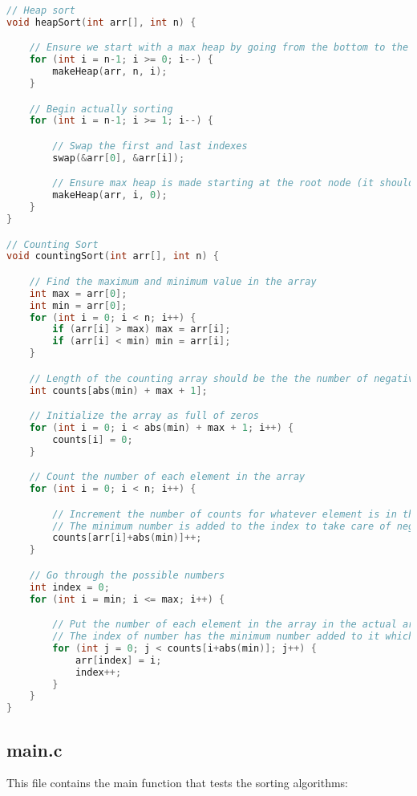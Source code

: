 \documentclass[12pt]{article}
\begin{document}
\begin{lstlisting}[language=c]
// Heap sort
void heapSort(int arr[], int n) {

	// Ensure we start with a max heap by going from the bottom to the top
	for (int i = n-1; i >= 0; i--) {
		makeHeap(arr, n, i);
	}

	// Begin actually sorting
	for (int i = n-1; i >= 1; i--) {

		// Swap the first and last indexes
		swap(&arr[0], &arr[i]);

		// Ensure max heap is made starting at the root node (it should be the largest)
		makeHeap(arr, i, 0);
	}
}

// Counting Sort
void countingSort(int arr[], int n) {

	// Find the maximum and minimum value in the array
	int max = arr[0];
	int min = arr[0];
	for (int i = 0; i < n; i++) {
		if (arr[i] > max) max = arr[i];
		if (arr[i] < min) min = arr[i];
	}

	// Length of the counting array should be the the number of negatives plus the number of positives plus another spot for 0
	int counts[abs(min) + max + 1];

	// Initialize the array as full of zeros
	for (int i = 0; i < abs(min) + max + 1; i++) {
		counts[i] = 0;
	}

	// Count the number of each element in the array
	for (int i = 0; i < n; i++) {

		// Increment the number of counts for whatever element is in the array
		// The minimum number is added to the index to take care of negative values
		counts[arr[i]+abs(min)]++;
	}

	// Go through the possible numbers
	int index = 0;
	for (int i = min; i <= max; i++) {

		// Put the number of each element in the array in the actual array
		// The index of number has the minimum number added to it which is to take care of negative elements
		for (int j = 0; j < counts[i+abs(min)]; j++) {
			arr[index] = i;
			index++;
		}
	}
}
\end{lstlisting}

\subsection{main.c}

This file contains the main function that tests the sorting algorithms:
\end{document}
